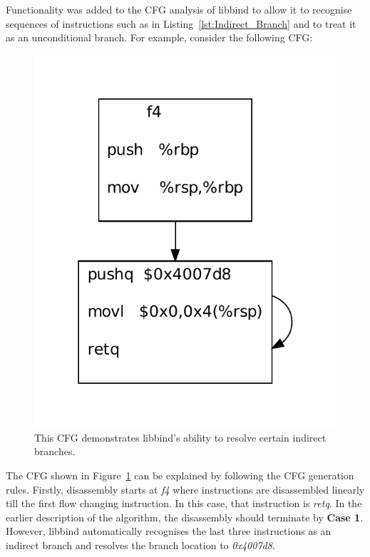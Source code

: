 Functionality was added to the CFG analysis of libbind to allow it to recognise sequences of instructions such as in Listing~\ref{lst:Indirect_Branch} and to treat it as an unconditional branch. For example, consider the following CFG:

\noindent\begin{minipage}{\textwidth}
\begin{figure}[H]
 \centering
 \includegraphics[scale=0.55]{Indirect.pdf}
 \caption{This CFG demonstrates libbind's ability to resolve certain indirect branches.}
 \label{fig:Indirect_CFG}
\end{figure}
\end{minipage}

The CFG shown in Figure~\ref{fig:Indirect_CFG} can be explained by following the CFG generation rules. Firstly, disassembly starts at \emph{f4} where instructions are disassembled linearly till the first flow changing instruction. In this case, that instruction is \emph{retq}. In the earlier description of the algorithm, the disassembly should terminate by \textbf{Case 1}. However, libbind automatically recognises the last three instructions as an indirect branch and resolves the branch location to \emph{0x4007d8}.

